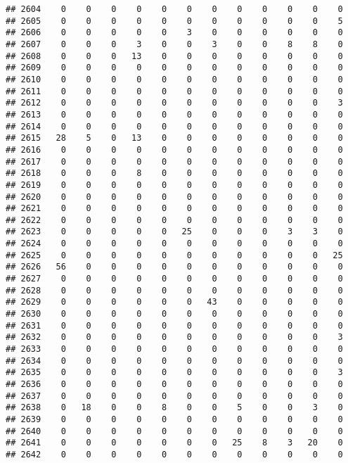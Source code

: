 \documentclass[]{article}
\begin{document}
\begin{verbatim}
## 2604    0    0    0    0    0    0    0    0    0    0    0    0
## 2605    0    0    0    0    0    0    0    0    0    0    0    5
## 2606    0    0    0    0    0    3    0    0    0    0    0    0
## 2607    0    0    0    3    0    0    3    0    0    8    8    0
## 2608    0    0    0   13    0    0    0    0    0    0    0    0
## 2609    0    0    0    0    0    0    0    0    0    0    0    0
## 2610    0    0    0    0    0    0    0    0    0    0    0    0
## 2611    0    0    0    0    0    0    0    0    0    0    0    0
## 2612    0    0    0    0    0    0    0    0    0    0    0    3
## 2613    0    0    0    0    0    0    0    0    0    0    0    0
## 2614    0    0    0    0    0    0    0    0    0    0    0    0
## 2615   28    5    0   13    0    0    0    0    0    0    0    0
## 2616    0    0    0    0    0    0    0    0    0    0    0    0
## 2617    0    0    0    0    0    0    0    0    0    0    0    0
## 2618    0    0    0    8    0    0    0    0    0    0    0    0
## 2619    0    0    0    0    0    0    0    0    0    0    0    0
## 2620    0    0    0    0    0    0    0    0    0    0    0    0
## 2621    0    0    0    0    0    0    0    0    0    0    0    0
## 2622    0    0    0    0    0    0    0    0    0    0    0    0
## 2623    0    0    0    0    0   25    0    0    0    3    3    0
## 2624    0    0    0    0    0    0    0    0    0    0    0    0
## 2625    0    0    0    0    0    0    0    0    0    0    0   25
## 2626   56    0    0    0    0    0    0    0    0    0    0    0
## 2627    0    0    0    0    0    0    0    0    0    0    0    0
## 2628    0    0    0    0    0    0    0    0    0    0    0    0
## 2629    0    0    0    0    0    0   43    0    0    0    0    0
## 2630    0    0    0    0    0    0    0    0    0    0    0    0
## 2631    0    0    0    0    0    0    0    0    0    0    0    0
## 2632    0    0    0    0    0    0    0    0    0    0    0    3
## 2633    0    0    0    0    0    0    0    0    0    0    0    0
## 2634    0    0    0    0    0    0    0    0    0    0    0    0
## 2635    0    0    0    0    0    0    0    0    0    0    0    3
## 2636    0    0    0    0    0    0    0    0    0    0    0    0
## 2637    0    0    0    0    0    0    0    0    0    0    0    0
## 2638    0   18    0    0    8    0    0    5    0    0    3    0
## 2639    0    0    0    0    0    0    0    0    0    0    0    0
## 2640    0    0    0    0    0    0    0    0    0    0    0    0
## 2641    0    0    0    0    0    0    0   25    8    3   20    0
## 2642    0    0    0    0    0    0    0    0    0    0    0    0

\end{verbatim}
\end{document}
